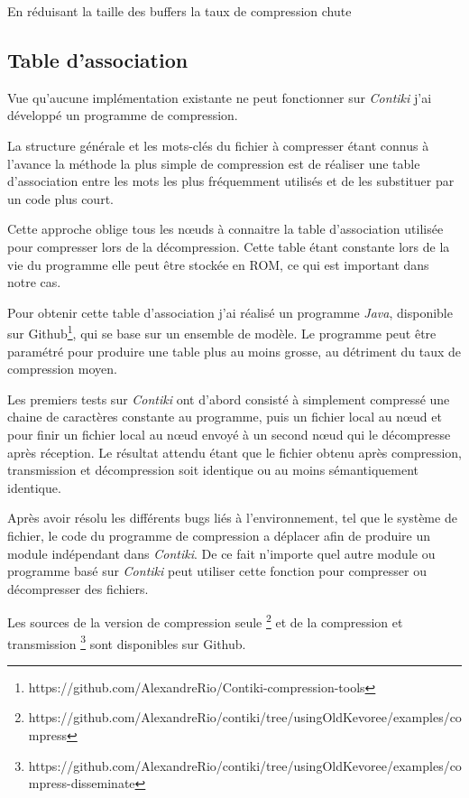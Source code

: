 


En réduisant la taille des buffers la taux de compression chute

\subsection{Table d'association}

Vue qu'aucune implémentation existante ne peut fonctionner sur \emph{Contiki} j'ai développé un programme de compression.

La structure générale et les mots-clés du fichier à compresser étant connus à l'avance la méthode la plus simple de compression est de réaliser une table d'association entre les mots les plus fréquemment utilisés et de les substituer par un code plus court.

Cette approche oblige tous les nœuds à connaitre la table d'association utilisée pour compresser lors de la décompression. Cette table étant constante lors de la vie du programme elle peut être stockée en ROM, ce qui est important dans notre cas.

Pour obtenir cette table d'association j'ai réalisé un programme \emph{Java}, disponible sur Github\footnote{https://github.com/AlexandreRio/Contiki-compression-tools}, qui se base sur un ensemble de modèle. Le programme peut être paramétré pour produire une table plus au moins grosse, au détriment du taux de compression moyen.

Les premiers tests sur \emph{Contiki} ont d'abord consisté à simplement compressé une   chaine de caractères constante au programme, puis un fichier local au nœud et pour finir un fichier local au nœud envoyé à un second nœud qui le décompresse après réception. Le résultat attendu étant que le fichier obtenu après compression, transmission et décompression soit identique ou au moins sémantiquement identique.

Après avoir résolu les différents bugs liés à l'environnement, tel que le système de fichier, le code du programme de compression a déplacer afin de produire un module indépendant dans \emph{Contiki}. De ce fait n'importe quel autre module ou programme basé sur \emph{Contiki} peut utiliser cette fonction pour compresser ou décompresser des fichiers.

Les sources de la version de compression seule \footnote{https://github.com/AlexandreRio/contiki/tree/usingOldKevoree/examples/compress} et de la compression et transmission \footnote{https://github.com/AlexandreRio/contiki/tree/usingOldKevoree/examples/compress-disseminate} sont disponibles sur Github.

